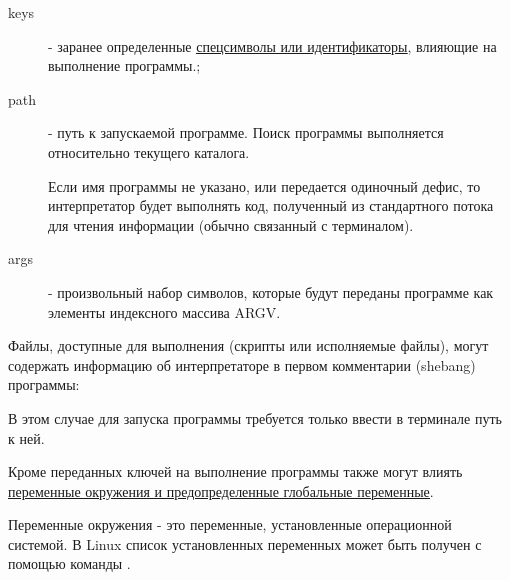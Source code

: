 \begin{description}
  \item[keys] - заранее определенные \hyperlink{appbin}{\underline{спецсимволы или идентификаторы}}, влияющие на выполнение программы.; 
  
  \item[path] - путь к запускаемой программе. Поиск программы выполняется относительно текущего каталога. 

  Если имя программы не указано, или передается одиночный дефис, то интерпретатор будет выполнять код, полученный из стандартного потока для чтения информации (обычно связанный с терминалом).
  
  \item[args] - произвольный набор символов, которые будут переданы программе как элементы индексного массива ARGV.
\end{description}

Файлы, доступные для выполнения (скрипты или исполняемые файлы), могут содержать информацию об интерпретаторе в первом комментарии (shebang) программы:


В этом случае для запуска программы требуется только ввести в терминале путь к ней.

Кроме переданных ключей на выполнение программы также могут влиять \hyperlink{appbin}{\underline{переменные окружения и предопределенные глобальные переменные}}.

Переменные окружения - это переменные, установленные операционной системой. В Linux список установленных переменных может быть получен с помощью команды .